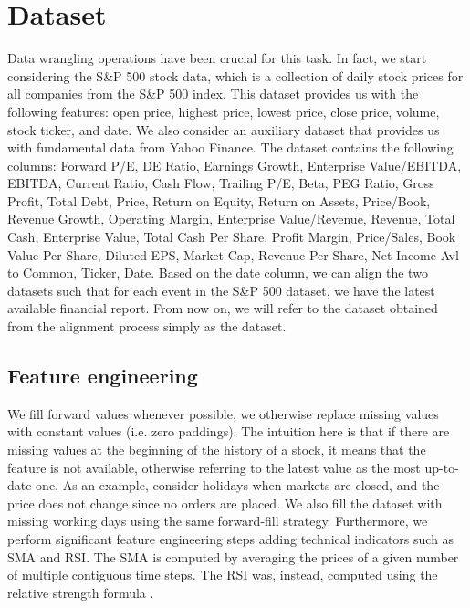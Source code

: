 \documentclass{article}
\begin{document}
\section{Dataset}

Data wrangling operations have been crucial for this task. In fact, we start considering the S\&P 500 stock data, which is a collection of daily stock prices for all companies from the S\&P 500 index. This dataset provides us with the following features: open price, highest price, lowest price, close price, volume, stock ticker, and date. We also consider an auxiliary dataset that provides us with fundamental data from Yahoo Finance. The dataset contains the following columns: Forward P/E, DE Ratio, Earnings Growth, Enterprise Value/EBITDA, EBITDA, Current Ratio, Cash Flow, Trailing P/E, Beta, PEG Ratio, Gross Profit, Total Debt, Price, Return on Equity, Return on Assets, Price/Book, Revenue Growth, Operating Margin, Enterprise Value/Revenue, Revenue, Total Cash, Enterprise Value, Total Cash Per Share, Profit Margin, Price/Sales, Book Value Per Share, Diluted EPS, Market Cap, Revenue Per Share, Net Income Avl to Common, Ticker, Date. Based on the date column, we can align the two datasets such that for each event in the S\&P 500 dataset, we have the latest available financial report. From now on, we will refer to the dataset obtained from the alignment process simply as the dataset.

\subsection{Feature engineering}

We fill forward values whenever possible, we otherwise replace missing values with constant values (i.e. zero paddings). The intuition here is that if there are missing values at the beginning of the history of a stock, it means that the feature is not available, otherwise referring to the latest value as the most up-to-date one. As an example, consider holidays when markets are closed, and the price does not change since no orders are placed. We also fill the dataset with missing working days using the same forward-fill strategy.
Furthermore, we perform significant feature engineering steps adding technical indicators
such as SMA and RSI. The SMA is computed by averaging the prices of a given number of multiple
contiguous time steps. The RSI was, instead, computed using the relative strength formula
\cite{rsi}.
\end{document}
